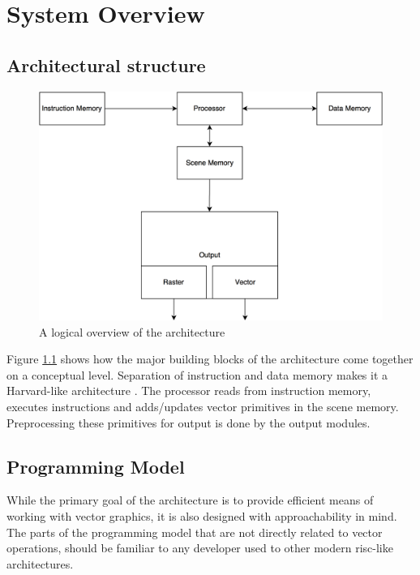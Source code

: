 \chapter{System Overview}
\label{chp:system-overview}



\section{Architectural structure}

\begin{figure}[H]
    \includegraphics[width=\linewidth]{images/system-overview.png}
    \caption{A logical overview of the \vthreek architecture}
    \label{fig:system-overview}
\end{figure}

Figure \ref{fig:system-overview} shows how the major building blocks of the \vthreek architecture come together on a conceptual level.
Separation of instruction and data memory makes it a Harvard-like architecture \cite{structured-computer-organization}.
The processor reads from instruction memory, executes instructions and adds/updates vector primitives in the scene memory.
Preprocessing these primitives for output is done by the output modules.

\section{Programming Model}
\label{sec:programming-model}

While the primary goal of the \vthreek architecture is to provide efficient means of working with vector graphics, it is also designed with approachability in mind.
The parts of the programming model that are not directly related to vector operations, should be familiar to any developer used to other modern \gls{risc}-like architectures.

